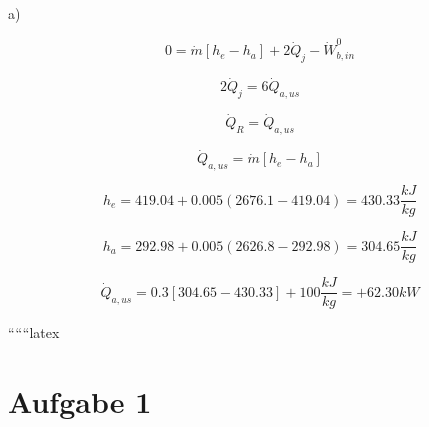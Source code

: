 a)

\[
0 = \dot{m} [h_e - h_a] + 2 \dot{Q}_j - \dot{W}_{b,in}^0
\]

\[
2 \dot{Q}_j = 6 \dot{Q}_{a,us}
\]

\[
\dot{Q}_R = \dot{Q}_{a,us}
\]

\[
\dot{Q}_{a,us} = \dot{m} [h_e - h_a]
\]

\[
h_e = 419.04 + 0.005 (2676.1 - 419.04) = 430.33 \frac{kJ}{kg}
\]

\[
h_a = 292.98 + 0.005 (2626.8 - 292.98) = 304.65 \frac{kJ}{kg}
\]

\[
\dot{Q}_{a,us} = 0.3 \left[ 304.65 - 430.33 \right] + 100 \frac{kJ}{kg} = +62.30 kW
\]

``````latex


\section*{Aufgabe 1}
